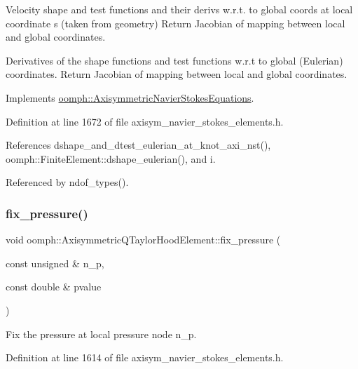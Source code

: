 Velocity shape and test functions and their derivs w.\+r.\+t. to global coords at local coordinate s (taken from geometry) Return Jacobian of mapping between local and global coordinates. 

Derivatives of the shape functions and test functions w.\+r.\+t to global (Eulerian) coordinates. Return Jacobian of mapping between local and global coordinates. 

Implements \hyperlink{classoomph_1_1AxisymmetricNavierStokesEquations_a8d958da8ef73dcf5c68360edc9d9f565}{oomph\+::\+Axisymmetric\+Navier\+Stokes\+Equations}.



Definition at line 1672 of file axisym\+\_\+navier\+\_\+stokes\+\_\+elements.\+h.



References dshape\+\_\+and\+\_\+dtest\+\_\+eulerian\+\_\+at\+\_\+knot\+\_\+axi\+\_\+nst(), oomph\+::\+Finite\+Element\+::dshape\+\_\+eulerian(), and i.



Referenced by ndof\+\_\+types().

\mbox{\label{classoomph_1_1AxisymmetricQTaylorHoodElement_a1557e286a76d63d79aabef3493cf0af2}} 
\subsubsection{\texorpdfstring{fix\+\_\+pressure()}{fix\_pressure()}}
{\footnotesize\ttfamily void oomph\+::\+Axisymmetric\+Q\+Taylor\+Hood\+Element\+::fix\+\_\+pressure (\begin{DoxyParamCaption}\item[{const unsigned \&}]{n\+\_\+p,  }\item[{const double \&}]{pvalue }\end{DoxyParamCaption})\hspace{0.3cm}{\ttfamily [inline]}}



Fix the pressure at local pressure node n\+\_\+p. 



Definition at line 1614 of file axisym\+\_\+navier\+\_\+stokes\+\_\+elements.\+h.



